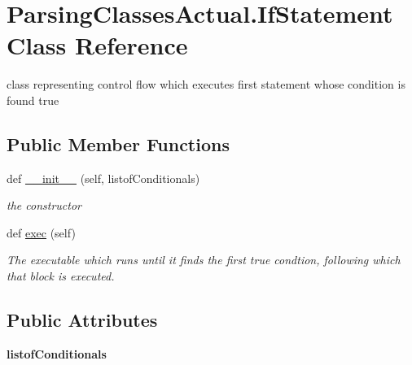\hypertarget{class_parsing_classes_actual_1_1_if_statement}{}\section{Parsing\+Classes\+Actual.\+If\+Statement Class Reference}
\label{class_parsing_classes_actual_1_1_if_statement}


class representing control flow which executes first statement whose condition is found true  


\subsection*{Public Member Functions}
\begin{DoxyCompactItemize}
\item 
def \hyperlink{class_parsing_classes_actual_1_1_if_statement_adcb418725eec33d6e81784b67c1fe776}{\+\_\+\+\_\+init\+\_\+\+\_\+} (self, listof\+Conditionals)
\begin{DoxyCompactList}\small\item\em the constructor \end{DoxyCompactList}\item 
def \hyperlink{class_parsing_classes_actual_1_1_if_statement_aede84cbec163184d403eb3626c08ed41}{exec} (self)\hypertarget{class_parsing_classes_actual_1_1_if_statement_aede84cbec163184d403eb3626c08ed41}{}\label{class_parsing_classes_actual_1_1_if_statement_aede84cbec163184d403eb3626c08ed41}

\begin{DoxyCompactList}\small\item\em The executable which runs until it finds the first true condtion, following which that block is executed. \end{DoxyCompactList}\end{DoxyCompactItemize}
\subsection*{Public Attributes}
\begin{DoxyCompactItemize}
\item 
{\bfseries listof\+Conditionals}\hypertarget{class_parsing_classes_actual_1_1_if_statement_a4b1d2d5524d305d12c7bee2d03f7877d}{}\label{class_parsing_classes_actual_1_1_if_statement_a4b1d2d5524d305d12c7bee2d03f7877d}

\end{DoxyCompactItemize}


